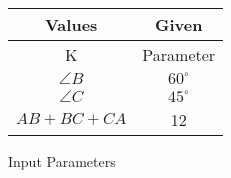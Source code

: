 \begin{tabular}[12pt]{ |c| c|}
    \hline
    \textbf{Values} & \textbf{Given}\\ 
    \hline
     K  & Parameter \\
    \hline 
     $\angle{B}$ & $60^\circ$\\
    \hline
     $\angle{C}$& $45^\circ$\\
    \hline
    $AB+BC+CA$ & 12 \\
    \hline 
    \end{tabular}
    \caption{Input Parameters}
